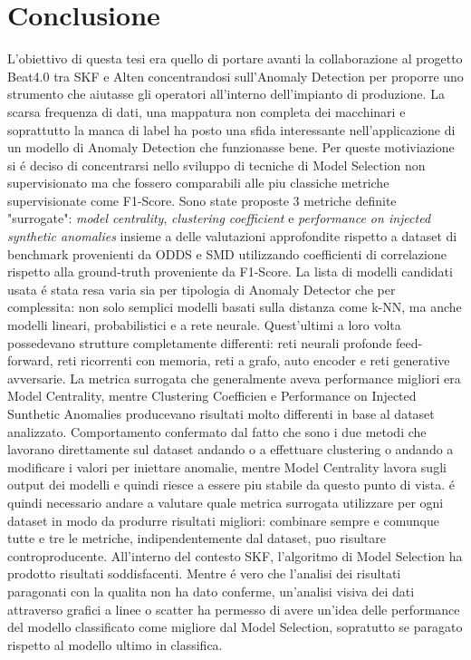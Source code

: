\chapter{Conclusione}
\label{chap:conclusion}
L'obiettivo di questa tesi era quello di portare avanti la collaborazione al progetto Beat4.0 tra SKF e Alten concentrandosi sull'Anomaly Detection per proporre uno strumento che aiutasse gli operatori all'interno dell'impianto di produzione. La scarsa frequenza di dati, una mappatura non completa dei macchinari e soprattutto la manca di label ha posto una sfida interessante nell'applicazione di un modello di Anomaly Detection che funzionasse bene.
Per queste motiviazione si é deciso di concentrarsi nello sviluppo di tecniche di Model Selection non supervisionato ma che fossero comparabili alle piu classiche metriche supervisionate come F1-Score.
Sono state proposte 3 metriche definite "surrogate": \textit{model centrality}, \textit{clustering coefficient} e \textit{performance on injected synthetic anomalies} insieme a delle valutazioni approfondite rispetto a dataset di benchmark provenienti da ODDS e SMD utilizzando coefficienti di correlazione rispetto alla ground-truth proveniente da F1-Score.
La lista di modelli candidati usata é stata resa varia sia per tipologia di Anomaly Detector che per complessita: non solo semplici modelli basati sulla distanza come k-NN, ma anche modelli lineari, probabilistici e a rete neurale. Quest'ultimi a loro volta possedevano strutture completamente differenti: reti neurali profonde feed-forward, reti ricorrenti con memoria, reti a grafo, auto encoder e reti generative avversarie.
La metrica surrogata che generalmente aveva performance migliori era Model Centrality, mentre Clustering Coefficien e Performance on Injected Sunthetic Anomalies producevano risultati molto differenti in base al dataset analizzato. Comportamento confermato dal fatto che sono i due metodi che lavorano direttamente sul dataset andando o a effettuare clustering o andando a modificare i valori per iniettare anomalie, mentre Model Centrality lavora sugli output dei modelli e quindi riesce a essere piu stabile da questo punto di vista.
é quindi necessario andare a valutare quale metrica surrogata utilizzare per ogni dataset in modo da produrre risultati migliori: combinare sempre e comunque tutte e tre le metriche, indipendentemente dal dataset, puo risultare controproducente.
All'interno del contesto SKF, l'algoritmo di Model Selection ha prodotto risultati soddisfacenti. Mentre é vero che l'analisi dei risultati paragonati con la qualita non ha dato conferme, un'analisi visiva dei dati attraverso grafici a linee o scatter ha permesso di avere un'idea delle performance del modello classificato come migliore dal Model Selection, sopratutto se paragato rispetto al modello ultimo in classifica.
